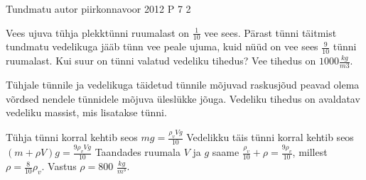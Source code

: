 {Tundmatu autor} %
{piirkonnavoor} %
{2012} %
{P 7} %
{2} %
{
\ifStatement
Vees ujuva tühja plekktünni ruumalast on $\frac{1}{10}$ vee sees. Pärast tünni täitmist tundmatu vedelikuga jääb tünn vee peale ujuma, kuid nüüd on vee sees $\frac{9}{10}$ tünni ruumalast. Kui suur on tünni valatud vedeliku tihedus? Vee tihedus on $1000 \frac{kg}{m3}$.
\fi


\ifHint
Tühjale tünnile ja vedelikuga täidetud tünnile mõjuvad raskusjõud peavad olema võrdsed nendele tünnidele mõjuva üleslükke jõuga. Vedeliku tihedus on avaldatav vedeliku massist, mis lisatakse tünni.
\fi

\ifSolution
Tühja tünni korral kehtib seos $mg = \frac {\rho_v V g}{10}$
\newline
Vedelikku täis tünni korral kehtib seos $(m + \rho V)g = \frac{9 \rho_v V g}{10}$
\newline
Taandades ruumala $V$ ja $g$ saame $\frac{\rho_v}{10} + \rho = \frac{9\rho_v}{10}$, millest $\rho = \frac{8}{10}\rho_v$.
\newline
Vastus $\rho = 800$ $\frac{kg}{m^3}$.
\fi
}